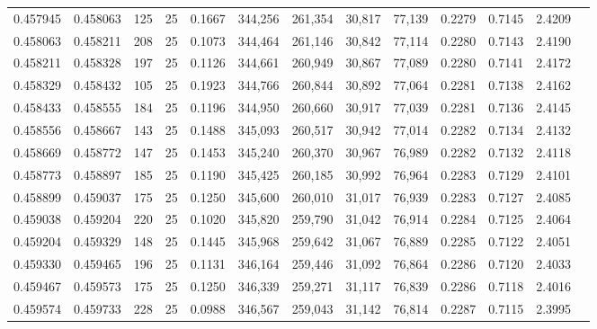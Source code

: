 \begin{tabular}{rrrrrrrrrrrrr}
0.457945 & 0.458063 &   125 &  25 &                                     0.1667 & 344,256 & 261,354 &  30,817 &  77,139 & 0.2279 & 0.7145 & 2.4209 \\
0.458063 & 0.458211 &   208 &  25 &                                     0.1073 & 344,464 & 261,146 &  30,842 &  77,114 & 0.2280 & 0.7143 & 2.4190 \\
0.458211 & 0.458328 &   197 &  25 &                                     0.1126 & 344,661 & 260,949 &  30,867 &  77,089 & 0.2280 & 0.7141 & 2.4172 \\
0.458329 & 0.458432 &   105 &  25 &                                     0.1923 & 344,766 & 260,844 &  30,892 &  77,064 & 0.2281 & 0.7138 & 2.4162 \\
0.458433 & 0.458555 &   184 &  25 &                                     0.1196 & 344,950 & 260,660 &  30,917 &  77,039 & 0.2281 & 0.7136 & 2.4145 \\
0.458556 & 0.458667 &   143 &  25 &                                     0.1488 & 345,093 & 260,517 &  30,942 &  77,014 & 0.2282 & 0.7134 & 2.4132 \\
0.458669 & 0.458772 &   147 &  25 &                                     0.1453 & 345,240 & 260,370 &  30,967 &  76,989 & 0.2282 & 0.7132 & 2.4118 \\
0.458773 & 0.458897 &   185 &  25 &                                     0.1190 & 345,425 & 260,185 &  30,992 &  76,964 & 0.2283 & 0.7129 & 2.4101 \\
0.458899 & 0.459037 &   175 &  25 &                                     0.1250 & 345,600 & 260,010 &  31,017 &  76,939 & 0.2283 & 0.7127 & 2.4085 \\
0.459038 & 0.459204 &   220 &  25 &                                     0.1020 & 345,820 & 259,790 &  31,042 &  76,914 & 0.2284 & 0.7125 & 2.4064 \\
0.459204 & 0.459329 &   148 &  25 &                                     0.1445 & 345,968 & 259,642 &  31,067 &  76,889 & 0.2285 & 0.7122 & 2.4051 \\
0.459330 & 0.459465 &   196 &  25 &                                     0.1131 & 346,164 & 259,446 &  31,092 &  76,864 & 0.2286 & 0.7120 & 2.4033 \\
0.459467 & 0.459573 &   175 &  25 &                                     0.1250 & 346,339 & 259,271 &  31,117 &  76,839 & 0.2286 & 0.7118 & 2.4016 \\
0.459574 & 0.459733 &   228 &  25 &                                     0.0988 & 346,567 & 259,043 &  31,142 &  76,814 & 0.2287 & 0.7115 & 2.3995 \\

\end{tabular}
